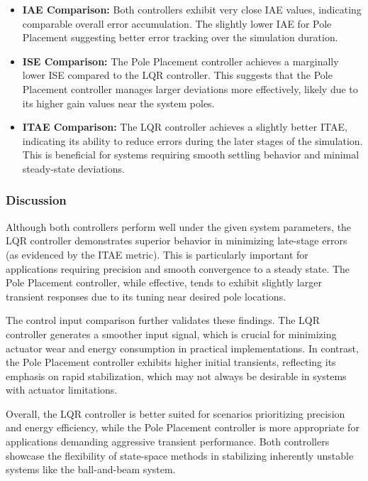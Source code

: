 \documentclass[conference]{IEEEtran}
\begin{document}
\begin{itemize}
    \item \textbf{IAE Comparison:}
    Both controllers exhibit very close IAE values, indicating comparable overall error accumulation. The slightly lower IAE for Pole Placement suggesting better error tracking over the simulation duration.
    \item \textbf{ISE Comparison:}
    The Pole Placement controller achieves a marginally lower ISE compared to the LQR controller. This suggests that the Pole Placement controller manages larger deviations more effectively, likely due to its higher gain values near the system poles.
    \item \textbf{ITAE Comparison:}
    The LQR controller achieves a slightly better ITAE, indicating its ability to reduce errors during the later stages of the simulation. This is beneficial for systems requiring smooth settling behavior and minimal steady-state deviations.
\end{itemize}

\subsubsection{Discussion}
Although both controllers perform well under the given system parameters, the LQR controller demonstrates superior behavior in minimizing late-stage errors (as evidenced by the ITAE metric). This is particularly important for applications requiring precision and smooth convergence to a steady state. The Pole Placement controller, while effective, tends to exhibit slightly larger transient responses due to its tuning near desired pole locations.

The control input comparison further validates these findings. The LQR controller generates a smoother input signal, which is crucial for minimizing actuator wear and energy consumption in practical implementations. In contrast, the Pole Placement controller exhibits higher initial transients, reflecting its emphasis on rapid stabilization, which may not always be desirable in systems with actuator limitations.

Overall, the LQR controller is better suited for scenarios prioritizing precision and energy efficiency, while the Pole Placement controller is more appropriate for applications demanding aggressive transient performance. Both controllers showcase the flexibility of state-space methods in stabilizing inherently unstable systems like the ball-and-beam system.
\end{document}
